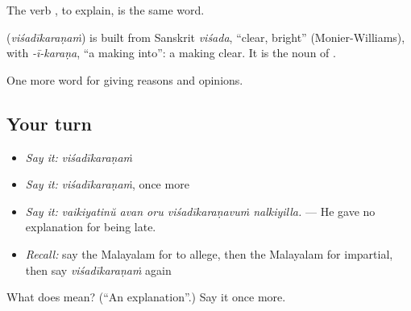 The verb , to explain, is the same word.

\begin{cousinweb}
\textbf{} (\emph{viśadīkaraṇaṁ}) is built from Sanskrit \emph{viśada}, \textquotedblleft{}clear, bright\textquotedblright{} (Monier-Williams), with \emph{-ī-karaṇa}, \textquotedblleft{}a making into\textquotedblright{}: a making clear. It is the noun of .
\end{cousinweb}

\begin{grammarlens}[title={What you've built}]
One more word for giving reasons and opinions.
\end{grammarlens}

\subsection*{Your turn}
\begin{itemize}
\raggedright
  \item \emph{Say it:} \emph{viśadīkaraṇaṁ}
  \item \emph{Say it:} \emph{viśadīkaraṇaṁ}, once more
  \item \emph{Say it:} \emph{vaikiyatinŭ avan oru viśadīkaraṇavuṁ nalkiyilla.} — He gave no explanation for being late.
  \item \emph{Recall:} say the Malayalam for to allege, then the Malayalam for impartial, then say \emph{viśadīkaraṇaṁ} again
\end{itemize}

\begin{tcolorbox}[breakable,colback=teal!4,colframe=teal!35!black,title={Before you move on}]
What does  mean? (\textquotedblleft{}An explanation\textquotedblright{}.) Say it once more.
\end{tcolorbox}

